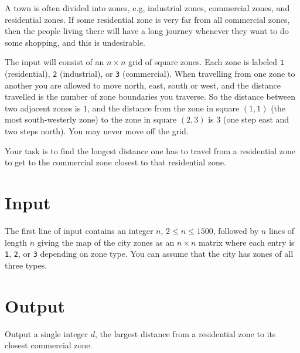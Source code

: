
A town is often divided into zones, e.g, industrial zones, commercial
zones, and residential zones. If some residential zone is very far
from all commercial zones, then the people living there will have a
long journey whenever they want to do some shopping, and this is
undesirable. 

The input will consist of an $n\times n$ grid of square zones. Each
zone is labeled \texttt{1} (residential), \texttt{2} (industrial), or
\texttt{3} (commercial). When travelling from one zone to another you
are allowed to move north, east, south or west, and the distance
travelled is the number of zone boundaries you traverse. So the
distance between two adjacent zones is $1$, and the distance from the
zone in square $(1,1)$ (the most south-westerly zone) to the zone in
square $(2,3)$ is $3$ (one step east and two steps north). You may
never move off the grid.

Your task is to find the longest distance one has to travel from a
residential zone to get to the commercial zone closest to that
residential zone.

\section*{Input}

The first line of input contains an integer $n$, $2\leq n\leq 1500$, 
followed by $n$ lines of
length $n$ giving the map of the city zones as an $n\times n$
matrix where each entry is \texttt{1}, \texttt{2}, or \texttt{3} depending on zone type. You can
assume that the city has zones of all three types.

\section*{Output}

Output a single integer $d$, the largest distance from a residential
zone to its closest commercial zone.
